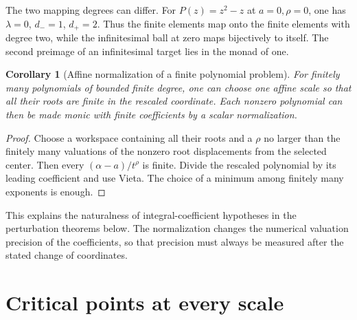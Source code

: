 \documentclass[11pt,letterpaper]{article}
\numberwithin{equation}{section}
\newtheorem{corollary}[theorem]{Corollary}
\theoremstyle{definition}
\theoremstyle{remark}\newtheorem{remark}[theorem]{Remark}
\begin{document}
The two mapping degrees can differ. For $P(z)=z^2-z$ at $a=0,\rho=0$,
one has $\lambda=0$, $d_-=1$, $d_+=2$. Thus the finite elements map
onto the finite elements with degree two, while the infinitesimal
ball at zero maps bijectively to itself. The second preimage of an
infinitesimal target lies in the monad of one.

\begin{corollary}[Affine normalization of a finite polynomial problem]
\label{cor:normalization}
For finitely many polynomials of bounded finite degree, one can choose
one affine scale so that all their roots are finite in the rescaled
coordinate. Each nonzero polynomial can then be made monic with finite
coefficients by a scalar normalization.
\end{corollary}
\begin{proof}
Choose a workspace containing all their roots and a $\rho$ no larger
than the finitely many valuations of the nonzero root displacements
from the selected center. Then every $(\alpha-a)/t^\rho$ is finite.
Divide the rescaled polynomial by its leading coefficient and use
Vieta. The choice of a minimum among finitely many exponents is enough.
\end{proof}
This explains the naturalness of integral-coefficient hypotheses in the
perturbation theorems below. The normalization changes the numerical
valuation precision of the coefficients, so that precision must always
be measured after the stated change of coordinates.

\section{Critical points at every scale}\label{sec:critical}
\end{document}
